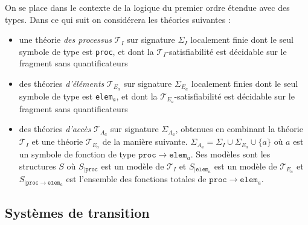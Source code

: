 \documentclass[a4paper, twoside]{scrartcl}
\theoremstyle{plain}%
\theoremstyle{definition}
\newtheorem{defn}{Définition}[section]
\theoremstyle{remark}
\begin{document}
On se place dans le contexte de la logique du premier ordre étendue
avec des types. Dans ce qui suit on considérera les théories suivantes
:
\begin{itemize}
\item une théorie \emph{des processus} $\mathcal{T}_I$ sur signature
  $\Sigma_I$ localement finie dont le seul symbole de type est
  \texttt{proc}, et dont la $\mathcal{T}_I$-satisfiabilité est
  décidable sur le fragment sans quantificateurs
\item des théories \emph{d'éléments} $\mathcal{T}_{E_a}$ sur
  signature $\Sigma_{E_a}$ localement finies dont le seul symbole de
  type est \texttt{elem$_a$}, et dont la
  $\mathcal{T}_{E_a}$-satisfiabilité est décidable sur le fragment
  sans quantificateurs
\item des théories \emph{d'accès} $\mathcal{T}_{A_a}$ sur signature
  $\Sigma_{A_a}$, obtenues en combinant la théorie $\mathcal{T}_I$ et
  une théorie $\mathcal{T}_{E_a}$ de la manière suivante.
  $\Sigma_{A_a} = \Sigma_I \cup \Sigma_{E_a} \cup \{a\}$ où $a$ est un
  symbole de fonction de type $\mathtt{proc} \to \mathtt{elem}_a$. Ses
  modèles sont les structures $S$ où $S_{|\mathtt{proc}}$ est un modèle
  de $\mathcal{T}_I$ et $S_{|\mathtt{elem}_a}$ est un modèle de
  $\mathcal{T}_{E_a}$ et $S_{|\mathtt{proc} \to \mathtt{elem}_a}$ est
  l'ensemble des fonctions totales de $\mathtt{proc} \to \mathtt{elem}_a$.

\end{itemize}




\subsection{Systèmes de transition}
\end{document}
